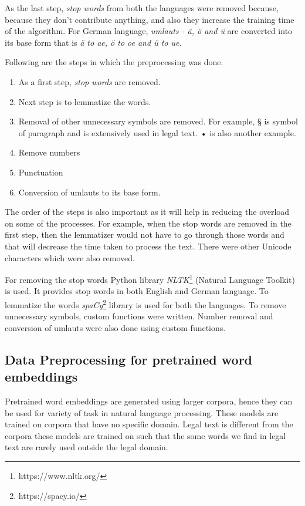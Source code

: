 As the last step, \textit{stop words} from both the languages were removed because, because they don't contribute anything, and also they increase the training time of the algorithm. For German language, \textit{umlauts - ä, ö and ü} are converted into its base form that is \textit{ä to ae, ö to oe and ü to ue.}

Following are the steps in which the preprocessing was done.

\begin{enumerate}
    \item As a first step, \textit{stop words} are removed.
    \item Next step is to lemmatize the words.
    \item Removal of other unnecessary symbols are removed. For example, § is symbol of paragraph and is extensively used in legal text. • is also another example.
    \item Remove numbers
    \item Punctuation 
    \item Conversion of umlauts to its base form.
\end{enumerate}

The order of the steps is also important as it will help in reducing the overload on some of the processes. For example, when the stop words are removed in the first step, then the lemmatizer would not have to go through those words and that will decrease the time taken to process the text. There were other Unicode characters which were also removed.

For removing the stop words Python library \textit{NLTK}\footnote{https://www.nltk.org/} (Natural Language Toolkit) is used. It provides stop words in both English and German language. To lemmatize the words \textit{spaCy}\footnote{https://spacy.io/} library is used for both the languages. To remove unnecessary symbols, custom functions were written. Number removal and conversion of umlauts were also done using custom functions.

\subsection{Data Preprocessing for pretrained word embeddings}
Pretrained word embeddings are generated using larger corpora, hence they can be used for variety of task in natural language processing. These models are trained on corpora that have no specific domain. Legal text is different from the corpora these models are trained on such that the some words we find in legal text are rarely used outside the legal domain. 

